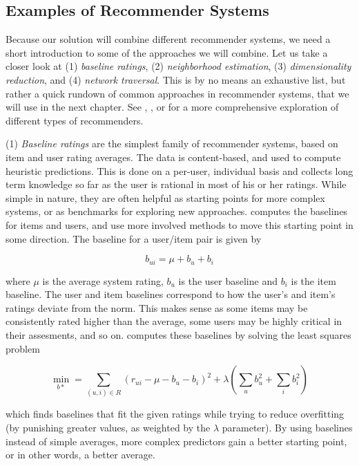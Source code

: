 \subsection{Examples of Recommender Systems}

Because our solution will combine different recommender systems, we need a short introduction to some of the approaches we will combine.
Let us take a closer look at (1) \emph{baseline ratings}, (2) \emph{neighborhood estimation}, (3) \emph{dimensionality reduction}, 
and (4) \emph{network traversal}. This is by no means an exhaustive list, but rather
a quick rundown of common approaches in recommender systems, that we will use in the next chapter.
See \cite{Adomavicius2005}, \cite{Pazzani2007}, \cite{Schafer2007} or \cite{Bjorkoy2010d} for a more comprehensive exploration of different types of recommenders.

(1) \emph{Baseline ratings} are the simplest family of recommender systems, based on item and user rating averages.
The data is content-based, and used to compute heuristic predictions. 
This is done on a per-user, individual basis and collects long term knowledge
so far as the user is rational in most of his or her ratings.
While simple in nature, they are often helpful as starting points for more complex systems, or as 
benchmarks for exploring new approaches. \cite[p2]{Koren2008} computes the baselines for items and users, and
use more involved methods to move this starting point in some direction. 
The baseline for a user/item pair is given by

\begin{equation*}
  b_{ui} = \mu + b_u + b_i
\end{equation*}

where $\mu$ is the average system rating, $b_u$ is the user baseline and $b_i$ is the item baseline.
The user and item baselines correspond to how the user's and item's ratings deviate from the norm.
This makes sense as some items may be consistently rated higher than the average, some users may be 
highly critical in their assesments, and so on. \citeauthor{Koren2008} computes these baselines by solving the
least squares problem

\begin{equation*}
  \min_{b*} = \sum_{(u,i) \in R} (r_{ui} - \mu - b_u - b_i)^2 + \lambda ( \sum_{u} b_u^2 + \sum_{i} b_i^2 )
\end{equation*}

which finds baselines that fit the given ratings while trying to reduce overfitting
(by punishing greater values, as weighted by the $\lambda$ parameter). 
By using baselines instead of simple averages, more complex predictors gain a better starting point,
or in other words, a better average.

